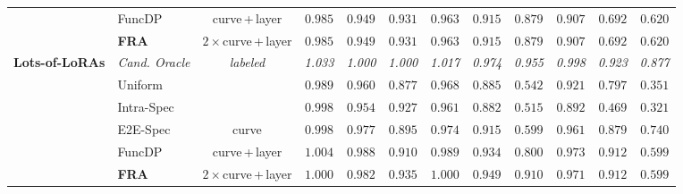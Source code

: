 \documentclass{article}
\newcommand{\xmark}{\ding{55}}%
\begin{document}
\begin{table}[t]
{\begin{tabular}{l | l | c | ccc | ccc | ccc}
    & FuncDP & curve\,+\,layer & \cellcolor{bestbg}\phantom{-}$0.985$ & \cellcolor{bestbg}\phantom{-}$0.949$ & \cellcolor{bestbg}\phantom{-}$0.931$ & \cellcolor{bestbg}\phantom{-}$0.963$ & \cellcolor{bestbg}\phantom{-}$0.915$ & \cellcolor{bestbg}\phantom{-}$0.879$ & \cellcolor{bestbg}\phantom{-}$0.907$ & \cellcolor{bestbg}\phantom{-}$0.692$ & \cellcolor{bestbg}\phantom{-}$0.620$ \\
    & \textbf{FRA} & $2\times$curve\,+\,layer & \cellcolor{bestbg}\phantom{-}$0.985$ & \cellcolor{bestbg}\phantom{-}$0.949$ & \cellcolor{bestbg}\phantom{-}$0.931$ & \cellcolor{bestbg}\phantom{-}$0.963$ & \cellcolor{bestbg}\phantom{-}$0.915$ & \cellcolor{bestbg}\phantom{-}$0.879$ & \cellcolor{bestbg}\phantom{-}$0.907$ & \cellcolor{bestbg}\phantom{-}$0.692$ & \cellcolor{bestbg}\phantom{-}$0.620$ \\
    \midrule[\heavyrulewidth]
    \multirow{6}{*}{\textbf{Lots-of-LoRAs}}
    & \cellcolor{oraclebg}\textit{Cand. Oracle} & \cellcolor{oraclebg}\textit{labeled} & \cellcolor{oraclebg}\textit{1.033} & \cellcolor{oraclebg}\textit{1.000} & \cellcolor{oraclebg}\textit{1.000} & \cellcolor{oraclebg}\textit{1.017} & \cellcolor{oraclebg}\textit{0.974} & \cellcolor{oraclebg}\textit{0.955} & \cellcolor{oraclebg}\textit{0.998} & \cellcolor{oraclebg}\textit{0.923} & \cellcolor{oraclebg}\textit{0.877} \\
    \cline{2-12}
    & Uniform & \xmark & \phantom{-}$0.989$ & \phantom{-}$0.960$ & \phantom{-}$0.877$ & \phantom{-}$0.968$ & \phantom{-}$0.885$ & \phantom{-}$0.542$ & \phantom{-}$0.921$ & \phantom{-}$0.797$ & \phantom{-}$0.351$ \\
    & Intra-Spec & \xmark & \phantom{-}$0.998$ & \phantom{-}$0.954$ & \phantom{-}$0.927$ & \phantom{-}$0.961$ & \phantom{-}$0.882$ & \phantom{-}$0.515$ & \phantom{-}$0.892$ & \phantom{-}$0.469$ & \phantom{-}$0.321$ \\
    & E2E-Spec & curve & \phantom{-}$0.998$ & \phantom{-}$0.977$ & \phantom{-}$0.895$ & \phantom{-}$0.974$ & \phantom{-}$0.915$ & \phantom{-}$0.599$ & \phantom{-}$0.961$ & \phantom{-}$0.879$ & \cellcolor{bestbg}\phantom{-}$0.740$ \\
    & FuncDP & curve\,+\,layer & \cellcolor{bestbg}\phantom{-}$1.004$ & \cellcolor{bestbg}\phantom{-}$0.988$ & \phantom{-}$0.910$ & \phantom{-}$0.989$ & \phantom{-}$0.934$ & \phantom{-}$0.800$ & \cellcolor{bestbg}\phantom{-}$0.973$ & \cellcolor{bestbg}\phantom{-}$0.912$ & \phantom{-}$0.599$ \\
    & \textbf{FRA} & $2\times$curve\,+\,layer & \phantom{-}$1.000$ & \phantom{-}$0.982$ & \cellcolor{bestbg}\phantom{-}$0.935$ & \cellcolor{bestbg}\phantom{-}$1.000$ & \cellcolor{bestbg}\phantom{-}$0.949$ & \cellcolor{bestbg}\phantom{-}$0.910$ & \phantom{-}$0.971$ & \cellcolor{bestbg}\phantom{-}$0.912$ & \phantom{-}$0.599$ \\

\end{tabular}}
\end{table}
\end{document}
